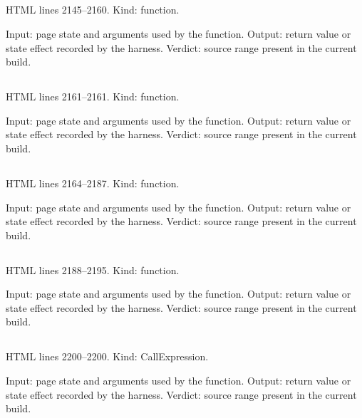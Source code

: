 \subsection*{\texttt{}}
\label{vf_40_gammap}
HTML lines 2145--2160. Kind: function.

Input: page state and arguments used by the function.
Output: return value or state effect recorded by the harness.
Verdict: source range present in the current build.

\subsection*{\texttt{}}
\label{vf_41_chiSqP}
HTML lines 2161--2161. Kind: function.

Input: page state and arguments used by the function.
Output: return value or state effect recorded by the harness.
Verdict: source range present in the current build.

\subsection*{\texttt{}}
\label{vf_42_tTest}
HTML lines 2164--2187. Kind: function.

Input: page state and arguments used by the function.
Output: return value or state effect recorded by the harness.
Verdict: source range present in the current build.

\subsection*{\texttt{}}
\label{vf_43_fitLin}
HTML lines 2188--2195. Kind: function.

Input: page state and arguments used by the function.
Output: return value or state effect recorded by the harness.
Verdict: source range present in the current build.

\subsection*{\texttt{}}
\label{vf_44_CRC_TABLE}
HTML lines 2200--2200. Kind: CallExpression.

Input: page state and arguments used by the function.
Output: return value or state effect recorded by the harness.
Verdict: source range present in the current build.


